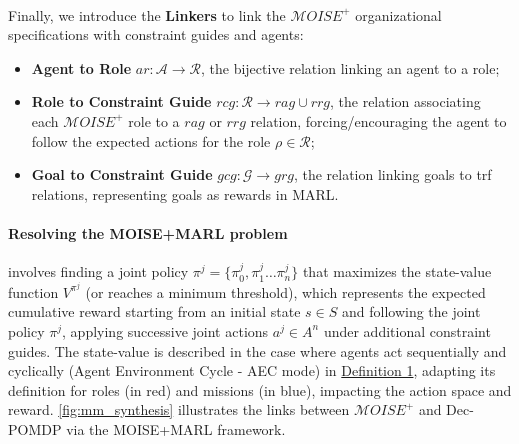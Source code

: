 \documentclass[sigconf,anonymous]{aamas}
\begin{document}
\

\noindent Finally, we introduce the \textbf{Linkers} to link the $\mathcal{M}OISE^+$ organizational specifications with constraint guides and agents:
%
\begin{itemize}
    \item \textbf{Agent to Role} \quad $ar: \mathcal{A} \to \mathcal{R}$, the bijective relation linking an agent to a role;
    \item \textbf{Role to Constraint Guide} \quad $rcg: \mathcal{R} \rightarrow rag \cup rrg$, the relation associating each $\mathcal{M}OISE^+$ role to a $rag$ or $rrg$ relation, forcing/encouraging the agent to follow the expected actions for the role $\rho \in \mathcal{R}$;
    \item \textbf{Goal to Constraint Guide} \quad $gcg: \mathcal{G} \rightarrow grg$, the relation linking goals to trf relations, representing goals as rewards in MARL.
\end{itemize}

\paragraph{\textbf{Resolving the MOISE+MARL problem}}
involves finding a joint policy $\pi^{j} = \{\pi^j_0,\pi^j_1\dots\pi^j_n\}$ that maximizes the state-value function $V^{\pi^{j}}$ (or reaches a minimum threshold), which represents the expected cumulative reward starting from an initial state $s \in S$ and following the joint policy $\pi^{j}$, applying successive joint actions $a^{j} \in A^n$ under additional constraint guides. The state-value is described in the case where agents act sequentially and cyclically (Agent Environment Cycle - AEC mode) in \hyperref[eq:single_value_function]{Definition 1}, adapting its definition for roles (in red) and missions (in blue), impacting the action space and reward. \autoref{fig:mm_synthesis} illustrates the links between $\mathcal{M}OISE^+$ and Dec-POMDP via the MOISE+MARL framework.
\end{document}
